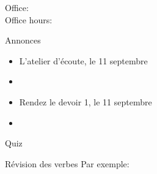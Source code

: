 \documentclass{beamer}
\subtitle[Activités]{Les activités, les verbes \lexi{-er} et la négation}
\begin{document}
  \begin{frame}
    \titlepage
    \tiny{Office: \\
          Office hours: }
  \end{frame}

  \begin{frame}{Annonces}
    \begin{itemize}
      \item L'atelier d'écoute, le 11 septembre
      \item[] 
      \item Rendez le devoir 1, le 11 septembre
      \item[] 
    \end{itemize}
  \end{frame}

  \begin{frame}{}
    \begin{center}
      \Large Quiz
    \end{center}
  \end{frame}

  \begin{frame}{Révision des verbes }
    Par exemple:
    \begin{center}
      
    \end{center}
  \end{frame}
\end{document}
